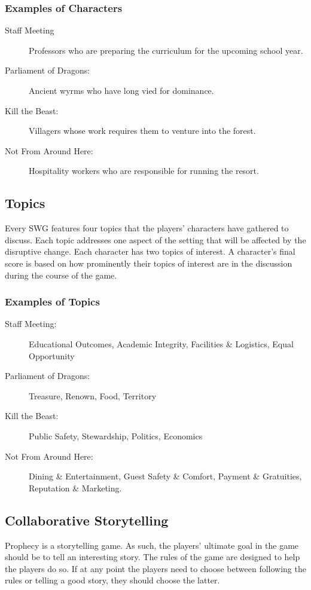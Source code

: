 \documentclass[12pt, a5paper, parskip=half-, footheight=1.4cm]{scrartcl}
\begin{document}
\subsubsection*{Examples of Characters}
\begin{description}
\item[Staff Meeting] Professors who are preparing the curriculum for the upcoming school year.
\item[Parliament of Dragons:] Ancient wyrms who have long vied for dominance.
\item[Kill the Beast:] Villagers whose work requires them to venture into the forest.
\item[Not From Around Here:] Hospitality workers who are responsible for running the resort.
\end{description}

\newpage

\subsection*{Topics}
Every SWG features four topics that the players' characters have gathered to discuss.
Each topic addresses one aspect of the setting that will be affected by the disruptive change.
Each character has two topics of interest.
A character's final score is based on how prominently their topics of interest are in the discussion during the course of the game.

\subsubsection*{Examples of Topics}
\begin{description}
\item[Staff Meeting:] Educational Outcomes, Academic Integrity, Facilities \& Logistics, Equal Opportunity
\item[Parliament of Dragons:] Treasure, Renown, Food, Territory
\item[Kill the Beast:] Public Safety, Stewardship, Politics, Economics
\item[Not From Around Here:] Dining \& Entertainment, Guest Safety \& Comfort, Payment \& Gratuities, Reputation \& Marketing.
\end{description}

\newpage

\subsection*{Collaborative Storytelling} \label{subsection:collaborative-storytelling}
Prophecy is a storytelling game.
As such, the players' ultimate goal in the game should be to tell an interesting story.
The rules of the game are designed to help the players do so.
If at any point the players need to choose between following the rules or telling a good story, they should choose the latter.
\end{document}
